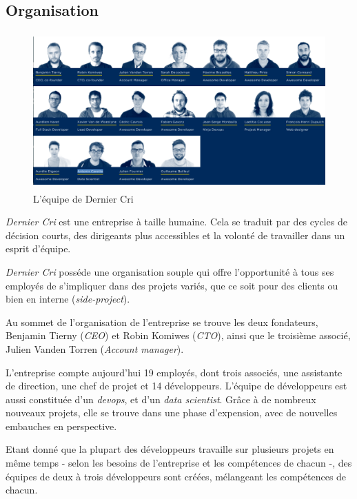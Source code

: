 \documentclass[12pt,a4paper]{article}
\begin{document}
  \bigskip

  \subsection{Organisation}\label{organisation}

  \begin{figure}[h]
    \centering
    \includegraphics[height=6cm]{figures/team.png}
    \caption{L'équipe de Dernier Cri}
  \end{figure}

  \bigskip

  \emph{Dernier Cri} est une entreprise à taille humaine. Cela se traduit
  par des cycles de décision courts, des dirigeants plus accessibles et la
  volonté de travailler dans un esprit d'équipe.

  \bigskip

  \emph{Dernier Cri} posséde une organisation souple qui offre
  l'opportunité à tous ses employés de s'impliquer dans des projets
  variés, que ce soit pour des clients ou bien en interne
  (\emph{side-project}).

  \bigskip

  Au sommet de l'organisation de l'entreprise se trouve les deux
  fondateurs, Benjamin Tierny (\emph{CEO}) et Robin Komiwes (\emph{CTO}),
  ainsi que le troisième associé, Julien Vanden Torren (\emph{Account
  manager}).

  \bigskip

  L'entreprise compte aujourd'hui 19 employés, dont trois associés, une
  assistante de direction, une chef de projet et 14 développeurs. L'équipe
  de développeurs est aussi constituée d'un \emph{devops}, et d'un
  \emph{data scientist}. Grâce à de nombreux nouveaux projets, elle se
  trouve dans une phase d'expension, avec de nouvelles embauches en
  perspective.

  \bigskip

  Etant donné que la plupart des développeurs travaille sur plusieurs
  projets en même temps - selon les besoins de l'entreprise et les
  compétences de chacun -, des équipes de deux à trois développeurs sont
  créées, mélangeant les compétences de chacun.
\end{document}
